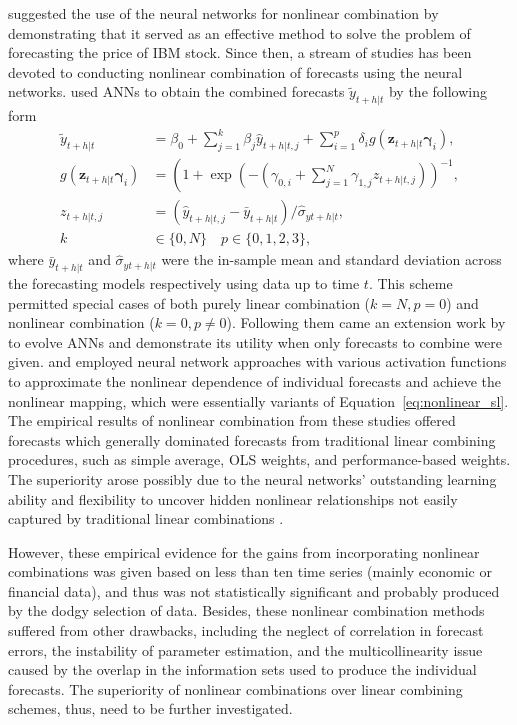 \documentclass[11pt]{article}
\begin{document}
\cite{Shanming_Shi1993-uk} suggested the use of the neural networks for nonlinear combination by demonstrating that it served as an effective method to solve the problem of forecasting the price of IBM stock. Since then, a stream of studies has been devoted to conducting nonlinear combination of forecasts using the neural networks. \cite{Donaldson1996-um} used ANNs to obtain the combined forecasts $\tilde{y}_{t+h|t}$ by the following form
\begin{align}
\tilde{y}_{t+h|t} &=\beta_{0}+\sum_{j=1}^{k} \beta_{j} \hat{y}_{t+h|t, j}+\sum_{i=1}^{p} \delta_{i} g\left(\mathbf{z}_{t+h|t} \mathbf{\gamma}_{i}\right), \label{eq:nonlinear_sl}\\
g\left(\mathbf{z}_{t+h|t} \mathbf{\gamma}_{i}\right) &=\left(1+\exp \left(-\left(\gamma_{0, i}+\sum_{j=1}^{N} \gamma_{1, j} z_{t+h|t, j}\right)\right)^{-1}\right., \nonumber \\
z_{t+h|t, j} &=\left(\hat{y}_{t+h|t, j}-\bar{y}_{t+h|t}\right) / \hat{\sigma}_{y t+h|t}, \nonumber \\
k & \in \{0,N\} \quad p \in \{0,1,2,3\}, \nonumber
\end{align}
where $\bar{y}_{t+h|t}$ and $\hat{\sigma}_{y t+h|t}$ were the in-sample mean and standard deviation across the forecasting models respectively using data up to time $t$. This scheme permitted special cases of both purely linear combination ($k=N, p=0$) and nonlinear combination ($k=0, p\neq 0$). Following them came an extension work by \cite{Harrald1997-gd} to evolve ANNs and demonstrate its utility when only forecasts to combine were given. \cite{Krasnopolsky2012-xu} and \cite{Babikir2016-xz} employed neural network approaches with various activation functions to approximate the nonlinear dependence of individual forecasts and achieve the nonlinear mapping, which were essentially variants of Equation~\eqref{eq:nonlinear_sl}. The empirical results of nonlinear combination from these studies offered forecasts which generally dominated forecasts from traditional linear combining procedures, such as simple average, OLS weights, and performance-based weights. The superiority arose possibly due to the neural networks' outstanding learning ability and flexibility to uncover hidden nonlinear relationships not easily captured by traditional linear combinations \citep{Donaldson1996-um,Babikir2016-xz}.

However, these empirical evidence for the gains from incorporating nonlinear combinations was given based on less than ten time series (mainly economic or financial data), and thus was not statistically significant and probably produced by the dodgy selection of data. Besides, these nonlinear combination methods suffered from other drawbacks, including the neglect of correlation in forecast errors, the instability of parameter estimation, and the multicollinearity issue caused by the overlap in the information sets used to produce the individual forecasts. The superiority of nonlinear combinations over linear combining schemes, thus, need to be further investigated.
\end{document}
